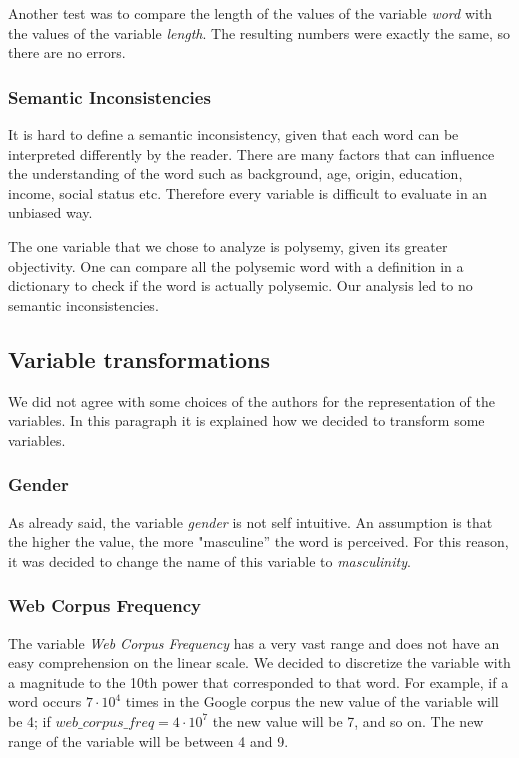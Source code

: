 \documentclass[a4paper,11pt,dvipsnames]{article}
\begin{document}
Another test was to compare the length of the values of the variable \textit{word} with the values of the variable \textit{length}. The resulting numbers were exactly the same, so there are no errors.


\subsubsection{Semantic Inconsistencies}

It is hard to define a semantic inconsistency, given that each word can be interpreted differently by the reader. There are many factors that can influence the understanding of the word such as background, age, origin, education, income, social status etc. Therefore every variable is difficult to evaluate in an unbiased way. 

The one variable that we chose to analyze is polysemy, given its greater objectivity. One can compare all the polysemic word with a definition in a dictionary to check if the word is actually polysemic. Our analysis led to no semantic inconsistencies.

\subsection{Variable transformations}

We did not agree with some choices of the authors for the representation of the variables. In this paragraph it is explained how we decided to transform some variables.

\subsubsection{Gender}

As already said, the variable \textit{gender} is not self intuitive.  An assumption is that  the  higher  the  value,  the  more "masculine'' the word is perceived. For this reason, it was decided to change the name of this variable to \textit{masculinity}.

\subsubsection{Web Corpus Frequency}\label{discretize}

The variable\textit{ Web Corpus Frequency} has a very vast range and does not have an easy comprehension on the linear scale. We decided to discretize the variable with a magnitude to the 10th power that corresponded to that word. For example, if a word occurs $7\cdot10^4$ times in the Google corpus the new value of the variable will be 4; if $web\_corpus\_freq=4\cdot 10^7$ the new value will be 7, and so on. The new range of the variable will be between 4 and 9. 
\end{document}
